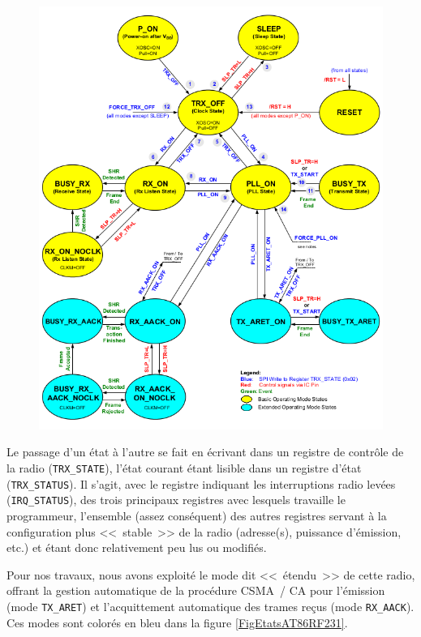 \begin{figure}[!hbt]
\centering
\includegraphics[width=12cm]{images/ch6-etats-at86rf231.png}
\label{FigEtatsAT86RF231}
\end{figure}

Le passage d'un état à l'autre se fait en écrivant dans un registre de
contrôle de la radio (\texttt{TRX\_STATE}), l'état courant étant lisible
dans un registre d'état (\texttt{TRX\_STATUS}). Il s'agit, avec le registre
indiquant les interruptions radio levées (\texttt{IRQ\_STATUS}), des trois
principaux registres avec lesquels travaille le programmeur, l'ensemble
(assez conséquent) des autres registres servant à la configuration
plus <<~stable~>> de la radio (adresse(s), puissance d'émission, etc.)
et étant donc relativement peu lus ou modifiés.

Pour nos travaux, nous avons exploité le mode dit <<~étendu~>> de cette
radio, offrant la gestion automatique de la procédure CSMA~/ CA pour
l'émission (mode \texttt{TX\_ARET}) et l'acquittement automatique des
trames reçus (mode \texttt{RX\_AACK}). Ces modes sont colorés en bleu
dans la figure \vref{FigEtatsAT86RF231}.

